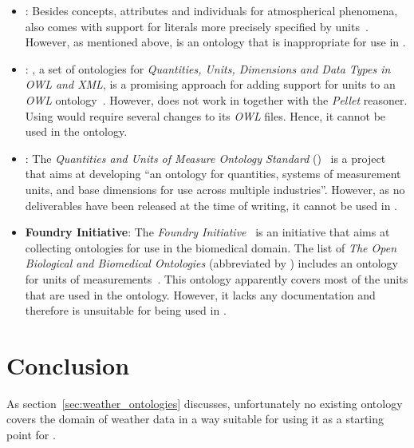 \begin{itemize}
  \item \textbf{}: Besides concepts, attributes and individuals for atmospherical phenomena,  also comes with support for literals more precisely specified by units~\cite{SWEET1}. However, as mentioned above,  is an ontology that is inappropriate for use in \smarthomeweather.
  
  \item \textbf{}: , a set of ontologies for \emph{Quantities, Units, Dimensions and Data Types in OWL and XML}, is a promising approach for adding support for units to an \emph{OWL} ontology~\cite{QUDT}. However,  does not work in \protege together with the \emph{Pellet} reasoner. Using  would require several changes to its \emph{OWL} files. Hence, it cannot be used in the \smarthomeweather ontology.
  
  \item \textbf{}: The \emph{ Quantities and Units of Measure Ontology Standard} ()~\cite{QUOMOS} is a project that aims at developing ``an ontology for quantities, systems of measurement units, and base dimensions for use across multiple industries''. However, as no deliverables have been released at the time of writing, it cannot be used in \smarthomeweather.
  
  \item \textbf{ Foundry Initiative}: The \emph{ Foundry Initiative}~\cite{OBOFoundry} is an initiative that aims at collecting ontologies for use in the biomedical domain. The list of \emph{The Open Biological and Biomedical Ontologies} (abbreviated by ) includes an ontology for units of measurements~\cite{OBOUnits1,OBOUnits2}. This ontology apparently covers most of the units that are used in the \smarthomeweather ontology. However, it lacks any documentation and therefore is unsuitable for being used in \smarthomeweather.
\end{itemize}

\section{Conclusion}

As section~\ref{sec:weather_ontologies} discusses, unfortunately no existing ontology covers the domain of weather data in a way suitable for using it as a starting point for \smarthomeweather.

